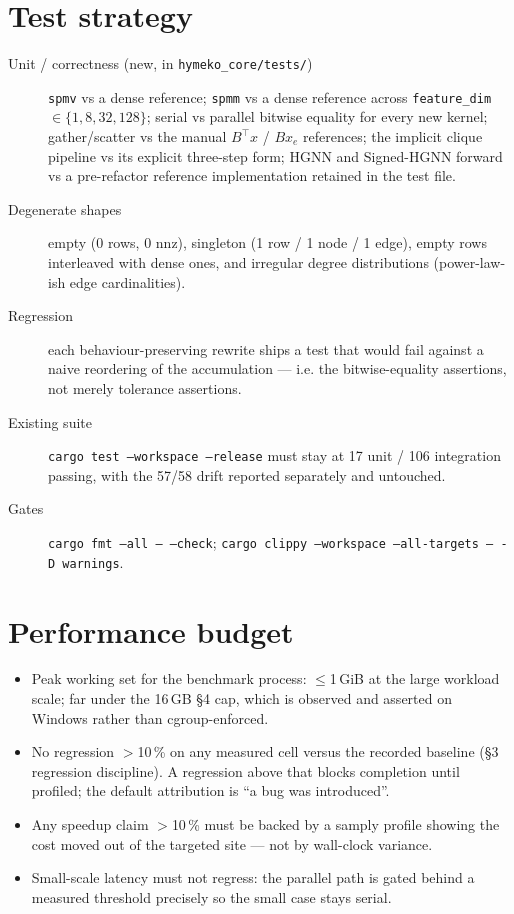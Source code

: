 \documentclass[11pt,a4paper]{article}
\begin{document}
\section{Test strategy}

\begin{description}
  \item[Unit / correctness (new, in \texttt{hymeko\_core/tests/})]
    \texttt{spmv} vs a dense reference; \texttt{spmm} vs a dense reference
    across \texttt{feature\_dim} $\in \{1,8,32,128\}$; serial vs parallel
    bitwise equality for every new kernel; gather/scatter vs the manual
    $B^\top x$ / $Bx_e$ references; the implicit clique pipeline vs its
    explicit three-step form; HGNN and Signed-HGNN forward vs a
    pre-refactor reference implementation retained in the test file.
  \item[Degenerate shapes] empty (0 rows, 0 nnz), singleton (1 row / 1 node
    / 1 edge), empty rows interleaved with dense ones, and irregular degree
    distributions (power-law-ish edge cardinalities).
  \item[Regression] each behaviour-preserving rewrite ships a test that
    would fail against a naive reordering of the accumulation --- i.e. the
    bitwise-equality assertions, not merely tolerance assertions.
  \item[Existing suite] \texttt{cargo test --workspace --release} must stay
    at 17 unit / 106 integration passing, with the 57/58 drift reported
    separately and untouched.
  \item[Gates] \texttt{cargo fmt --all -- --check};
    \texttt{cargo clippy --workspace --all-targets -- -D warnings}.
\end{description}

\section{Performance budget}

\begin{itemize}
  \item Peak working set for the benchmark process: $\le$1\,GiB at the large
    workload scale; far under the 16\,GB \S4 cap, which is observed and
    asserted on Windows rather than cgroup-enforced.
  \item No regression $>$10\,\% on any measured cell versus the recorded
    baseline (\S3 regression discipline). A regression above that blocks
    completion until profiled; the default attribution is ``a bug was
    introduced''.
  \item Any speedup claim $>$10\,\% must be backed by a samply profile
    showing the cost moved out of the targeted site --- not by wall-clock
    variance.
  \item Small-scale latency must not regress: the parallel path is gated
    behind a measured threshold precisely so the small case stays serial.
\end{itemize}
\end{document}
